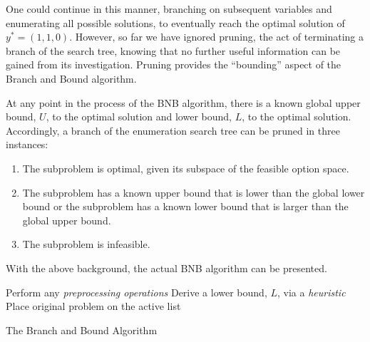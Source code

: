 One could continue in this manner, branching on subsequent variables and
enumerating all possible solutions, to eventually reach the optimal solution of
$y^* = (1, 1, 0)$. However, so far we have ignored pruning, the act of
terminating a branch of the search tree, knowing that no further useful
information can be gained from its investigation. Pruning provides the
``bounding'' aspect of the Branch and Bound algorithm.

At any point in the process of the BNB algorithm, there is a known global upper
bound, $U$, to the optimal solution and lower bound, $L$, to the optimal
solution. Accordingly, a branch of the enumeration search tree can be pruned in
three instances:

\begin{enumerate}
        \item The subproblem is optimal, given its subspace of the feasible
        option space.
        \item The subproblem has a known upper bound that is lower
        than the global lower bound or the subproblem has a known lower bound
        that is larger than the global upper bound.
        \item The subproblem is infeasible.
\end{enumerate}

With the above background, the actual BNB algorithm can be presented.
\\
\begin{algorithm}[H]
 \SetAlgoLined
 Perform any \emph{preprocessing operations}\;
 Derive a lower bound, $L$, via a \emph{heuristic}\;
 Place original problem on the active list\;
 \caption{The Branch and Bound Algorithm}
\end{algorithm}

